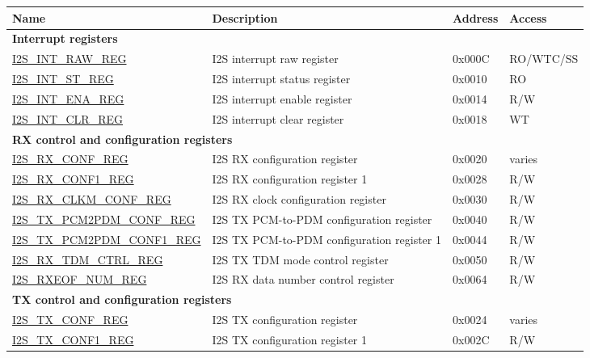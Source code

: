 \begin{longtable}{ | p{5cm} | p{7.2cm} | p{1.3cm} | p{2cm} | }
\hline\rowcolor{lightgray}
\textbf{Name} & \textbf{Description} &  \textbf{Address} & \textbf{Access} \\ \hline
\endhead
\multicolumn{4}{|l|}{\textbf{Interrupt registers}} \\ \hline
\hyperref[regdesc:I2SINTRAWREG]{I2S\_INT\_RAW\_REG} & I2S interrupt raw register  & 0x000C & RO/WTC/SS \\ \hline
\hyperref[regdesc:I2SINTSTREG]{I2S\_INT\_ST\_REG} & I2S interrupt status register & 0x0010 & RO \\ \hline
\hyperref[regdesc:I2SINTENAREG]{I2S\_INT\_ENA\_REG} & I2S interrupt enable register & 0x0014 & R/W \\ \hline
\hyperref[regdesc:I2SINTCLRREG]{I2S\_INT\_CLR\_REG} & I2S interrupt clear register & 0x0018 & WT \\ \hline
\multicolumn{4}{|l|}{\textbf{RX control and configuration registers}} \\ \hline
\hyperref[regdesc:I2SRXCONFREG]{I2S\_RX\_CONF\_REG} & I2S RX configuration register & 0x0020 & varies \\ \hline
\hyperref[regdesc:I2SRXCONF1REG]{I2S\_RX\_CONF1\_REG} & I2S RX configuration register 1 & 0x0028 & R/W \\ \hline
\hyperref[regdesc:I2SRXCLKMCONFREG]{I2S\_RX\_CLKM\_CONF\_REG} & I2S RX clock configuration register & 0x0030 & R/W \\ \hline
\hyperref[regdesc:I2STXPCM2PDMCONFREG]{I2S\_TX\_PCM2PDM\_CONF\_REG} & I2S TX PCM-to-PDM configuration register & 0x0040 & R/W \\ \hline
\hyperref[regdesc:I2STXPCM2PDMCONF1REG]{I2S\_TX\_PCM2PDM\_CONF1\_REG} & I2S TX PCM-to-PDM configuration register 1 & 0x0044 & R/W \\ \hline
\hyperref[regdesc:I2SRXTDMCTRLREG]{I2S\_RX\_TDM\_CTRL\_REG} & I2S TX TDM mode control register & 0x0050 & R/W \\ \hline
\hyperref[regdesc:I2SRXEOFNUMREG]{I2S\_RXEOF\_NUM\_REG} & I2S RX data number control register & 0x0064 & R/W \\ \hline
\multicolumn{4}{|l|}{\textbf{TX control and configuration registers}} \\ \hline
\hyperref[regdesc:I2STXCONFREG]{I2S\_TX\_CONF\_REG} & I2S TX configuration register & 0x0024 & varies \\ \hline
\hyperref[regdesc:I2STXCONF1REG]{I2S\_TX\_CONF1\_REG} & I2S TX configuration register 1 & 0x002C & R/W \\ \hline

\end{longtable}
